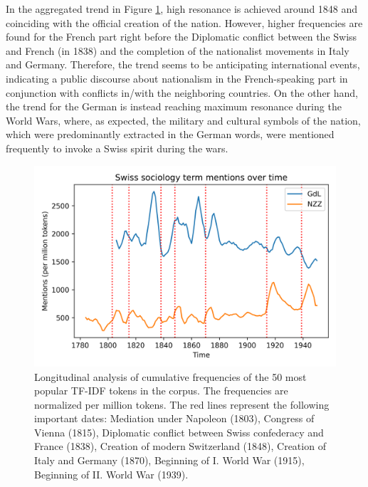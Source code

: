 \documentclass[11pt]{article}
\begin{document}
In the aggregated trend in Figure \ref{fig:cumulative_sociology}, high resonance is achieved around 1848 and coinciding with the official creation of the nation. However, higher frequencies are found for the French part right before the Diplomatic conflict between the Swiss and French (in 1838) and the completion of the nationalist movements in Italy and Germany. Therefore, the trend seems to be anticipating international events, indicating a public discourse about nationalism in the French-speaking part in conjunction with conflicts in/with the neighboring countries. On the other hand, the trend for the German is instead reaching maximum resonance during the World Wars, where, as expected, the military and cultural symbols of the nation, which were predominantly extracted in the German words, were mentioned frequently to invoke a Swiss spirit during the wars. 


\begin{figure}[H]
    \centering
    \includegraphics[width=1\linewidth]{figures/mentions_sociology.png}
    \caption{Longitudinal analysis of cumulative frequencies of the 50 most popular TF-IDF tokens in the corpus. The frequencies are normalized per million tokens. The red lines represent the following important dates: Mediation under Napoleon (1803), Congress of Vienna (1815), Diplomatic conflict between Swiss confederacy and France (1838), Creation of modern Switzerland (1848), Creation of Italy and Germany (1870), Beginning of I. World War (1915), Beginning of II. World War (1939).}
    \label{fig:cumulative_sociology}
\end{figure}
\end{document}

